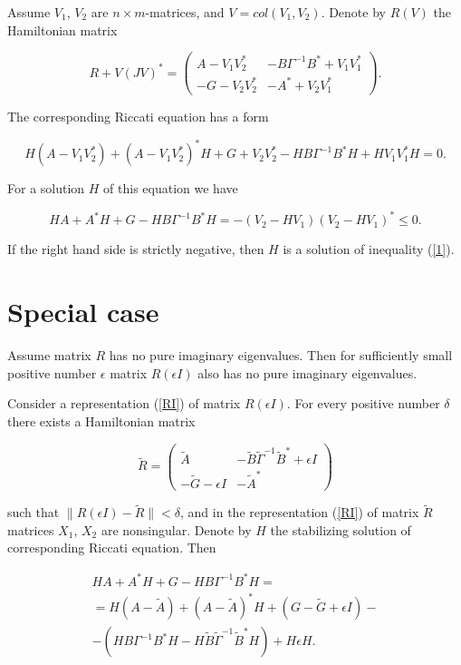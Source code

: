 \documentclass[11pt, reqno]{amsart}
\theoremstyle{plain}
\begin{document}
Assume $V_{1}$, $V_{2}$ are $n\times m$-matrices, and $V=col(V_{1},V_{2})$. Denote by $R(V)$ the Hamiltonian matrix 

$$ R + V(JV)^{*} = \left(\begin{array}{cc} 
A-V_{1}V_{2}^{*} & -B\Gamma^{-1}B^{*}+V_{1}V_{1}^{*} \\  
-G-V_{2}V_{2}^{*} & -A^{*}+V_{2}V_{1}^{*} \end{array}\right).
$$

The corresponding Riccati equation has a form

\begin{equation}\label{REV}
H(A-V_{1}V_{2}^{*})+(A-V_{1}V_{2}^{*})^{*}H + G + V_{2}V_{2}^{*}-
HB\Gamma^{-1}B^{*}H + HV_{1}V_{1}^{*}H = 0.
\end{equation}

For a solution $H$ of this equation we have 

$$ HA + A^{*}H + G - HB\Gamma^{-1}B^{*}H = -(V_{2}-HV_{1})(V_{2}-HV_{1})^{*} \le 0.$$

\noindent If the right hand side is strictly negative, then $H$ is a solution of inequality (\ref{1}). 

\section{Special case}

Assume matrix $R$ has no pure imaginary eigenvalues. Then for sufficiently small positive number $\epsilon$ matrix $R(\epsilon I)$ also has no pure imaginary eigenvalues. 

Consider a representation (\ref{RI}) of matrix $R(\epsilon I)$. For every positive number $\delta$ there exists a Hamiltonian matrix 

$$ \tilde R = \left(\begin{array}{cc} 
\tilde A & -\tilde B\tilde\Gamma ^{-1}\tilde B^{*} + \epsilon I \\  
-\tilde G -\epsilon I & -\tilde A^{*} \end{array}\right)
$$

\noindent such that $\|R(\epsilon I)-\tilde R\|<\delta$, and in the representation (\ref{RI}) of matrix $\tilde R$ matrices $X_{1}$, $X_{2}$ are nonsingular. Denote by $H$ the stabilizing solution of corresponding Riccati equation. Then

$$\begin{array}{c} HA + A^{*}H + G - HB\Gamma^{-1}B^{*}H = \\
= H(A-\tilde A) + (A-\tilde A)^{*}H + (G-\tilde G+\epsilon I) - \\
- (HB\Gamma^{-1}B^{*}H - H\tilde B\tilde\Gamma^{-1}\tilde B^{*}H) + H\epsilon H.
\end{array}
$$
\end{document}
